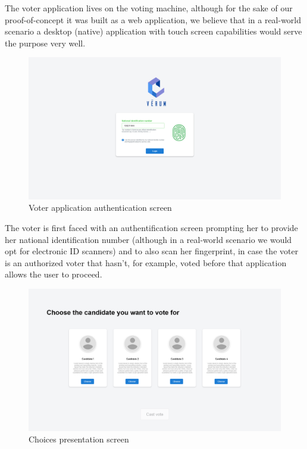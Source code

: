 The voter application lives on the voting machine, although for the sake of our proof-of-concept it was built as a web application, we believe that in a real-world scenario a desktop (native) application with touch screen capabilities would serve the purpose very well.

\begin{figure}[H]
	\centering
		\includegraphics[width=14cm]{images/chapter3/voter_2.png}
		\caption{{\footnotesize Voter application authentication screen}}
\end{figure}

The voter is first faced with an authentification screen prompting her to provide her national identification number (although in a real-world scenario we would opt for electronic ID scanners) and to also scan her fingerprint, in case the voter is an authorized voter that hasn't, for example, voted before that application allows the user to proceed.

\begin{figure}[H]
	\centering
		\includegraphics[width=14cm]{images/chapter3/voter_3.png}
		\caption{{\footnotesize Choices presentation screen}}
\end{figure}

